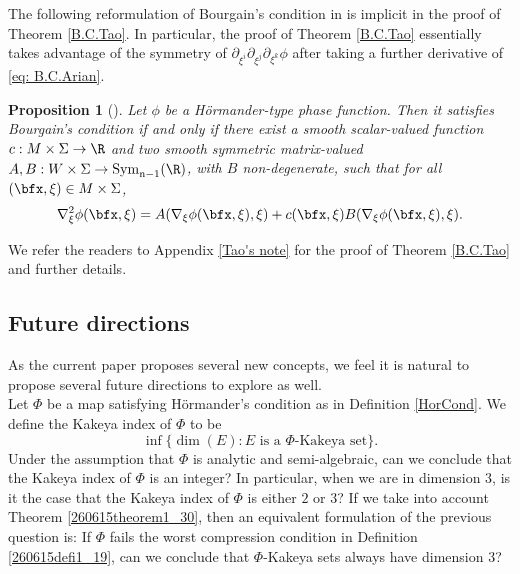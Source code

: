 \documentclass{article}
\numberwithin{equation}{section}
\theoremstyle{plain}
\newtheorem{proposition}[theorem]{Proposition}
\begin{document}
The following reformulation of Bourgain's condition in \cite{nadjimzadah2026bourgainsconditionstickykakeya} is implicit in the proof of Theorem \ref{B.C.Tao}. In particular, the proof of Theorem \ref{B.C.Tao} essentially takes advantage of the symmetry of $\partial_{\xi^i} \partial_{\xi^j} \partial_{\xi^k} \phi$ after taking a further derivative of \eqref{eq: B.C.Arian}. %
\begin{proposition}[\cite{nadjimzadah2026bourgainsconditionstickykakeya}]\label{B.C.Arian}
    Let $\phi$ be a H\"ormander-type phase function. Then it satisfies Bourgain's condition if and only if there exist a smooth scalar-valued function $c: M\times\Sigma\to\R$ and two smooth symmetric matrix-valued $A,B: W\times \Sigma\to \rm{Sym}_{n-1}(\R)$, with $B$ non-degenerate, such that for all $(\bfx,\xi)\in M\times\Sigma$,
    \begin{align}\label{eq: B.C.Arian}
        \nabla_\xi^2\phi(\bfx,\xi)= A(\nabla_\xi\phi(\bfx,\xi),\xi) + c(\bfx,\xi)B(\nabla_\xi\phi(\bfx,\xi),\xi).
    \end{align}
\end{proposition}
We refer the readers to Appendix \ref{Tao's note} for the proof of Theorem \ref{B.C.Tao} and further details. 



\subsection{Future directions}


As the current paper proposes several new concepts, we feel it is natural to propose several future directions to explore as well. \\




Let $\Phi$ be a map satisfying H\"ormander's condition as in Definition \ref{HorCond}. We define the Kakeya index of $\Phi$ to be 
\begin{equation}\label{260714e1_81}
    \inf\{\dim(E): E\text{ is a } \text{$\Phi$-Kakeya set}\}.
\end{equation}
Under the assumption that $\Phi$ is analytic and semi-algebraic, can we conclude  that the Kakeya index of $\Phi$ is an integer? In particular, when we are in dimension 3, is it the case that the Kakeya index of $\Phi$ is either $2$ or $3$? If we take into account Theorem \ref{260615theorem1_30}, then an equivalent formulation of the previous question is: If $\Phi$ fails the worst compression condition in Definition \ref{260615defi1_19}, can we conclude that $\Phi$-Kakeya sets always have dimension 3? 
\end{document}
